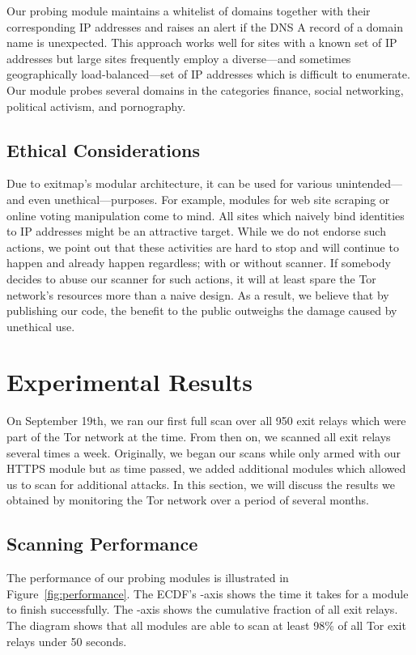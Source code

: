\documentclass[letterpaper,twocolumn,10pt]{article}
\begin{document}
Our probing module maintains a whitelist of domains together with their corresponding IP addresses
and raises an alert if the DNS A record of a domain name is unexpected.  This approach works well
for sites with a known set of IP addresses but large sites frequently employ a diverse---and
sometimes geographically load-balanced---set of IP addresses which is difficult to enumerate.  Our
module probes several domains in the categories finance, social networking, political activism, and
pornography.



\subsection{Ethical Considerations}
Due to \textsf{exitmap}'s modular architecture, it can be used for various unintended---and even
unethical---purposes.  For example, modules for web site scraping or online voting manipulation come
to mind.  All sites which naively bind identities to IP addresses might be an attractive target.
While we do not endorse such actions, we point out that these activities are hard to stop and will
continue to happen and already happen regardless; with or without scanner.  If somebody decides to
abuse our scanner for such actions, it will at least spare the Tor network's resources more than a
naive design.  As a result, we believe that by publishing our code, the benefit to the public
outweighs the damage caused by unethical use.

\section{Experimental Results}
\label{sec:results}
On September 19th, we ran our first full scan over all 950 exit relays which were part of the
Tor network at the time. From then on, we scanned all exit relays several times a week.  Originally,
we began our scans while only armed with our HTTPS module but as time passed, we added additional
modules which allowed us to scan for additional attacks.  In this section, we will discuss the
results we obtained by monitoring the Tor network over a period of several months.

\subsection{Scanning Performance}
The performance of our probing modules is illustrated in Figure~\ref{fig:performance}.  The ECDF's
-axis shows the time it takes for a module to finish successfully.  The -axis shows the
cumulative fraction of all exit relays.  The diagram shows that all modules are able to scan at
least 98\% of all Tor exit relays  under 50 seconds.
\end{document}

